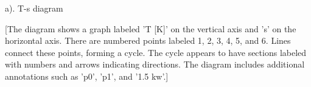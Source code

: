a). T-s diagram

[The diagram shows a graph labeled 'T [K]' on the vertical axis and 's' on the horizontal axis. There are numbered points labeled 1, 2, 3, 4, 5, and 6. Lines connect these points, forming a cycle. The cycle appears to have sections labeled with numbers and arrows indicating directions. The diagram includes additional annotations such as 'p0', 'p1', and '1.5 kw'.]